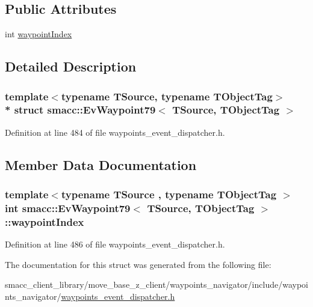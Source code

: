\subsection*{Public Attributes}
\begin{DoxyCompactItemize}
\item 
int \hyperlink{structsmacc_1_1EvWaypoint79_a4e1986cff0d18aefc320a508c27bdaf2}{waypoint\+Index}
\end{DoxyCompactItemize}


\subsection{Detailed Description}
\subsubsection*{template$<$typename T\+Source, typename T\+Object\+Tag$>$\\*
struct smacc\+::\+Ev\+Waypoint79$<$ T\+Source, T\+Object\+Tag $>$}



Definition at line 484 of file waypoints\+\_\+event\+\_\+dispatcher.\+h.



\subsection{Member Data Documentation}
\subsubsection[{\texorpdfstring{waypoint\+Index}{waypointIndex}}]{\setlength{\rightskip}{0pt plus 5cm}template$<$typename T\+Source , typename T\+Object\+Tag $>$ int {\bf smacc\+::\+Ev\+Waypoint79}$<$ T\+Source, T\+Object\+Tag $>$\+::waypoint\+Index}\hypertarget{structsmacc_1_1EvWaypoint79_a4e1986cff0d18aefc320a508c27bdaf2}{}\label{structsmacc_1_1EvWaypoint79_a4e1986cff0d18aefc320a508c27bdaf2}


Definition at line 486 of file waypoints\+\_\+event\+\_\+dispatcher.\+h.



The documentation for this struct was generated from the following file\+:\begin{DoxyCompactItemize}
\item 
smacc\+\_\+client\+\_\+library/move\+\_\+base\+\_\+z\+\_\+client/waypoints\+\_\+navigator/include/waypoints\+\_\+navigator/\hyperlink{waypoints__event__dispatcher_8h}{waypoints\+\_\+event\+\_\+dispatcher.\+h}\end{DoxyCompactItemize}
